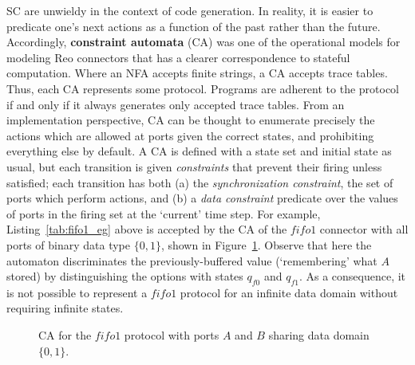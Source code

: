 SC are unwieldy in the context of code generation. In reality, it is easier to predicate one's next actions as a function of the past rather than the future. Accordingly, \textbf{constraint automata} (CA) was one of the operational models for modeling Reo connectors that has a clearer correspondence to stateful computation. Where an NFA accepts finite strings, a CA accepts trace tables. Thus, each CA represents some protocol. Programs are adherent to the protocol if and only if it always generates only accepted trace tables. From an implementation perspective, CA can be thought to enumerate precisely the actions which are allowed at ports given the correct states, and prohibiting everything else by default. A CA is defined with a state set and initial state as usual, but each transition is given \textit{constraints} that prevent their firing unless satisfied; each transition has both (a) the \textit{synchronization constraint}, the set of ports which perform actions, and (b) a \textit{data constraint} predicate over the values of ports in the firing set at the `current' time step. For example, Listing~\ref{tab:fifo1_eg} above is accepted by the CA of the $fifo1$ connector with all ports of binary data type $\{0,1\}$, shown in Figure~\ref{fig:fifo1_ca}. Observe that here the automaton discriminates the previously-buffered value (`remembering' what $A$ stored) by distinguishing the options with states $q_{f0}$ and $q_{f1}$. As a consequence, it is not possible to represent a $fifo1$ protocol for an infinite data domain without requiring infinite states.
\begin{figure}[ht]
	\centering
	\caption[CA for fifo1 connector.]{CA for the $fifo1$ protocol with ports $A$ and $B$ sharing data domain $\{0,1\}$.}
	\label{fig:fifo1_ca}
\end{figure}

